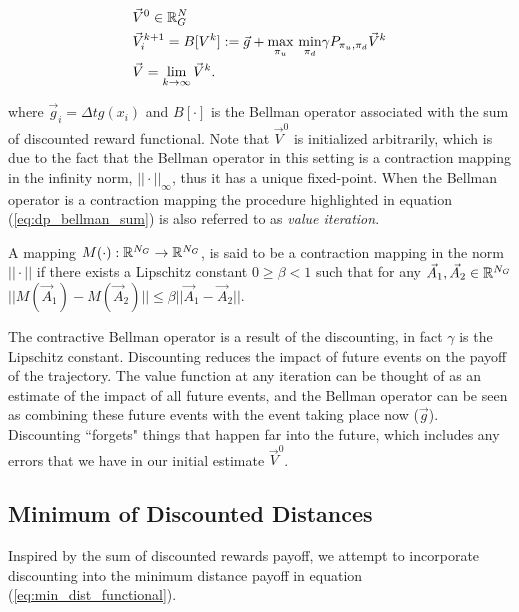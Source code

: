 \documentclass[letterpaper, 10 pt, conference]{ieeeconf}
\begin{document}
\begin{subequations}\label{eq:dp_bellman_sum}
\begin{align}
&\vec{V}^{0} \in \mathbb{R}^N_G\\
&\vec{V}_{i}^{k+1} = B[V^k] := \vec{g} +  \underset{\pi_u}{\max}\text{ }\underset{ \pi_d}{\min} \gamma P_{\pi_u, \pi_d} \vec{V}^k  \\
&\vec{V} = \lim_{k\rightarrow \infty} \vec{V}^{k}.
\end{align}
\end{subequations}

\noindent where $\vec{g}_i =\Delta t g(x_i)$ and $B[\cdot]$ is the Bellman operator associated with the sum of discounted reward functional. Note that $\vec{V}^{0}$ is initialized arbitrarily, which is due to the fact that the Bellman operator in this setting is a contraction mapping in the infinity norm, $||\cdot||_\infty$, thus it has a unique fixed-point. When the Bellman operator is a contraction mapping the procedure highlighted in equation (\ref{eq:dp_bellman_sum}) is also referred to as \emph{value iteration}.

\begin{definition} A mapping $M(\cdot): \mathbb{R}^{N_G} \rightarrow \mathbb{R}^{N_G}$, is said to be a contraction mapping in the norm $|| \cdot ||$ if there exists  a Lipschitz constant $0\geq \beta < 1$ such that for any $\vec{A}_1, \vec{A}_2 \in \mathbb{R}^{N_G}$ $||M(\vec{A}_1) - M(\vec{A}_2)|| \leq \beta ||\vec{A}_1 - \vec{A}_2||$. 
\end{definition}

The contractive Bellman operator is a result of the discounting, in fact $\gamma$ is the Lipschitz constant. Discounting reduces the impact of future events on the payoff of the trajectory. The value function at any iteration can be thought of as an estimate of the impact of all future events, and the Bellman operator can be seen as combining these future events with the event taking place now ($\vec{g}$). Discounting ``forgets" things that happen far into the future, which includes any errors that we have in our initial estimate $\vec{V}^0$.  

\subsection {Minimum of Discounted Distances}
Inspired by the sum of discounted rewards payoff, we attempt to incorporate discounting into the minimum distance payoff in equation (\ref{eq:min_dist_functional}).
\end{document}
